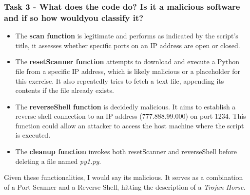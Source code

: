 \subsubsection{Task 3 - What does the code do? Is it a malicious software and if so how wouldyou classify it?}
\begin{itemize}
    \item The \textbf{scan function} is legitimate and performs as indicated by the script's title, it assesses whether specific ports on an IP address are open or closed.

    \item The \textbf{resetScanner function} attempts to download and execute a Python file from a specific IP address, which is likely malicious or a placeholder for this exercise. It also repeatedly tries to fetch a text file, appending its contents if the file already exists.

    \item The \textbf{reverseShell function} is decidedly malicious. It aims to establish a reverse shell connection to an IP address (777.888.99.000) on port 1234. This function could allow an attacker to access the host machine where the script is executed.

    \item The \textbf{cleanup function} invokes both resetScanner and reverseShell before deleting a file named \textit{py1.py}.
\end{itemize}

Given these functionalities, I would say its malicious. It serves as a combination of a Port Scanner and a Reverse Shell, hitting the description of a \textit{Trojan Horse}.



